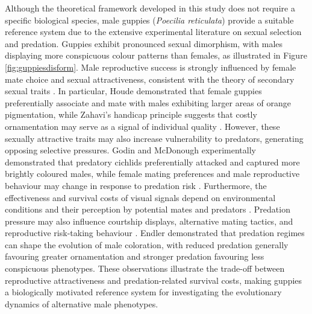 Although the theoretical framework developed in this study does not require a specific biological species, male guppies (\textit{Poecilia reticulata}) provide a suitable reference system due to the extensive experimental literature on sexual selection and predation. Guppies exhibit pronounced sexual dimorphism, with males displaying more conspicuous colour patterns than females, as illustrated in Figure \ref{fig:guppiesdisform}. Male reproductive success is strongly influenced by female mate choice and sexual attractiveness, consistent with the theory of secondary sexual traits \cite{andersson1994,houdeSexColorMate1997}. In particular, Houde \cite{houdeMATECHOICEBASED1987} demonstrated that female guppies preferentially associate and mate with males exhibiting larger areas of orange pigmentation, while Zahavi's handicap principle suggests that costly ornamentation may serve as a signal of individual quality \cite{zahavi1987signal}. However, these sexually attractive traits may also increase vulnerability to predators, generating opposing selective pressures. Godin and McDonough \cite{godinPredatorPreferenceBrightly2003} experimentally demonstrated that predatory cichlids preferentially attacked and captured more brightly coloured males, while female mating preferences and male reproductive behaviour may change in response to predation risk \cite{godinFemaleMateChoice1996,magnhagen1991}. Furthermore, the effectiveness and survival costs of visual signals depend on environmental conditions and their perception by potential mates and predators \cite{endler1991}. Predation pressure may also influence courtship displays, alternative mating tactics, and reproductive risk-taking behaviour \cite{bothamRISKSENSITIVEANTIPREDATORBEHAVIOR2008,smithBehavioralTypesPredictors2010,goslinePredatorinducedPlasticityGuppy2008}. Endler \cite{endlerNATURALSELECTIONCOLOR1980} demonstrated that predation regimes can shape the evolution of male coloration, with reduced predation generally favouring greater ornamentation and stronger predation favouring less conspicuous phenotypes. These observations illustrate the trade-off between reproductive attractiveness and predation-related survival costs, making guppies a biologically motivated reference system for investigating the evolutionary dynamics of alternative male phenotypes.\\ 

